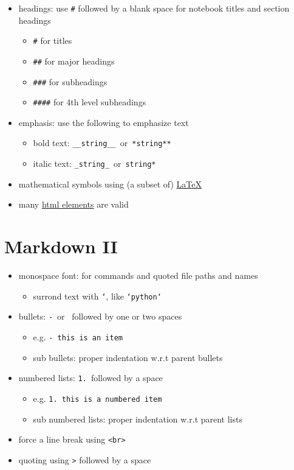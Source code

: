 \documentclass[11pt]{extarticle}
\begin{document}
\begin{itemize}
  \item headings: use {\tt \#} followed by a blank space for notebook titles and section headings
    \begin{itemize}
      \item {\tt \#} for titles
      \item {\tt \#\#} for major headings
      \item {\tt \#\#\#} for subheadings
      \item{\tt \#\#\#\#} for 4th level subheadings
    \end{itemize}
  \item emphasis: use the following to emphasize text
    \begin{itemize}
      \item bold text: {\tt \_\_string\_\_}$\,$ or $\,${\tt **string**}
      \item italic text: {\tt \_string\_}$\,$ or $\,${\tt *string*}
    \end{itemize}
  \item mathematical symbols using (a subset of) \href{https://en.wikibooks.org/wiki/LaTeX}{\LaTeX{}}
  \item many \href{https://www.w3.org/TR/html401/}{html elements} are valid
\end{itemize}

\newpage

\section*{Markdown II}

\begin{itemize}
  \item monospace font: for commands and quoted file paths and names 
    \begin{itemize}
      \item surrond text with {\tt `}, like {\tt `python`}
    \end{itemize}
  \item bullets: {\tt -}$\,$ or $\,${\tt *} followed by one or two spaces
    \begin{itemize}
      \item e.g. {\tt - this is an item}
      \item sub bullets: proper indentation w.r.t parent bullets 
    \end{itemize}
  \item numbered lists: {\tt 1.}$\,$ followed by a space
    \begin{itemize}
      \item e.g. {\tt 1.\,this is a numbered item}
      \item sub numbered lists: proper indentation w.r.t parent lists 
    \end{itemize}
  \item force a line break using {\tt <br>}
  \item quoting using {\tt >} followed by a space
\end{itemize}
\end{document}
